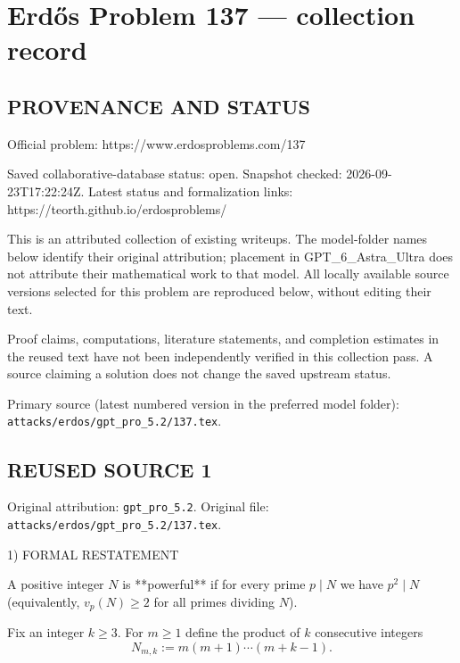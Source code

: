 \section*{Erd\H{o}s Problem 137 --- collection record}

\subsection*{PROVENANCE AND STATUS}
Official problem: https://www.erdosproblems.com/137

Saved collaborative-database status: open.
Snapshot checked: 2026-09-23T17:22:24Z.
Latest status and formalization links: https://teorth.github.io/erdosproblems/

This is an attributed collection of existing writeups. The model-folder names below identify their original attribution; placement in GPT\_6\_Astra\_Ultra does not attribute their mathematical work to that model. All locally available source versions selected for this problem are reproduced below, without editing their text.

Proof claims, computations, literature statements, and completion estimates in the reused text have not been independently verified in this collection pass. A source claiming a solution does not change the saved upstream status.

Primary source (latest numbered version in the preferred model folder): \texttt{attacks/erdos/gpt\_pro\_5.2/137.tex}.

\subsection*{REUSED SOURCE 1}
Original attribution: \texttt{gpt\_pro\_5.2}.
Original file: \texttt{attacks/erdos/gpt\_pro\_5.2/137.tex}.


1) FORMAL RESTATEMENT

A positive integer $N$ is **powerful** if for every prime $p\mid N$ we have $p^2\mid N$ (equivalently, $v_p(N)\ge 2$ for all primes dividing $N$).

Fix an integer $k\ge 3$. For $m\ge 1$ define the product of $k$ consecutive integers
\[
N_{m,k}:= m(m+1)\cdots (m+k-1).
\]

